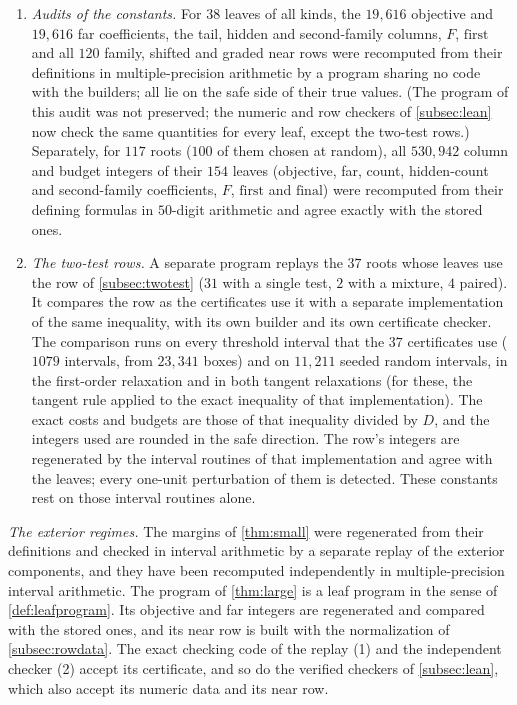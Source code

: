 \begin{enumerate}[(1)]
    unfavourable direction, were all rejected by the replay.
  \item \emph{Audits of the constants.} For $38$ leaves of all kinds, the $19{,}616$ objective and
    $19{,}616$ far coefficients, the tail, hidden and second-family columns, $F$, $\mathrm{first}$ and
    all $120$ family, shifted and graded near rows were recomputed from their definitions in
    multiple-precision arithmetic by a program sharing no code with the builders; all lie on the
    safe side of their true values. (The program of this audit was not preserved; the numeric and
    row checkers of \cref{subsec:lean} now check the same quantities for every leaf, except the
    two-test rows.) Separately, for $117$ roots ($100$ of them chosen at random),
    all $530{,}942$ column and budget integers of their $154$ leaves (objective, far, count,
    hidden-count and second-family coefficients, $F$, $\mathrm{first}$ and $\mathrm{final}$) were
    recomputed from their defining formulas in $50$-digit arithmetic and agree exactly with the
    stored ones.
  \item \emph{The two-test rows.} A separate program replays the $37$ roots whose leaves use the
    row of \cref{subsec:twotest} ($31$ with a single test, $2$ with a mixture, $4$ paired). It
    compares the row as the certificates use it with a separate implementation of the same
    inequality, with its own builder and its own certificate checker. The
    comparison runs on every threshold interval that the $37$ certificates use ($1079$ intervals,
    from $23{,}341$ boxes) and on $11{,}211$ seeded random intervals, in the first-order relaxation
    and in both tangent relaxations (for these, the tangent rule applied to the exact inequality of
    that implementation). The exact costs and budgets are those of that inequality divided by $D$,
    and the integers used are rounded in the safe direction. The row's integers are regenerated by
    the interval routines of that implementation and agree with the leaves; every one-unit
    perturbation of them is detected. These constants rest on those interval routines alone.
\end{enumerate}

\emph{The exterior regimes.} The margins of \cref{thm:small} were regenerated from their
definitions and checked in interval arithmetic by a separate replay of the exterior components,
and they have been recomputed independently in multiple-precision interval arithmetic. The
program of \cref{thm:large} is a leaf program in the sense of \cref{def:leafprogram}. Its
objective and far integers are regenerated and compared with the stored ones, and its near row is
built with the normalization of \cref{subsec:rowdata}. The exact checking code of the replay (1)
and the independent checker (2) accept its certificate, and so do the verified checkers of
\cref{subsec:lean}, which also accept its numeric data and its near row.

